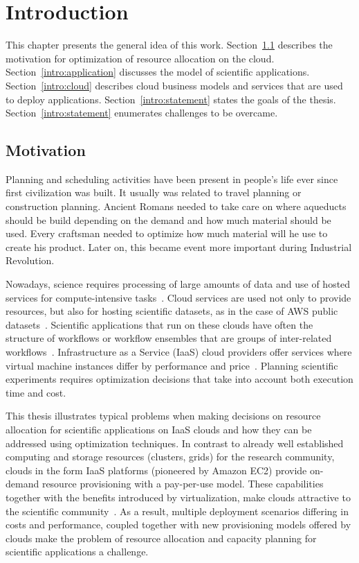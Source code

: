 \chapter{Introduction}
\label{chap:introduction} 

This chapter presents the general idea of this work. Section~\ref{intro:motivation} describes the motivation for optimization of resource allocation on the cloud. Section~\ref{intro:application} discusses the model of scientific applications. Section~\ref{intro:cloud} describes cloud business models and services that are used to deploy applications. Section~\ref{intro:statement} states the goals of the thesis. Section~\ref{intro:statement} enumerates challenges to be overcame. 

\section{Motivation}
\label{intro:motivation}

Planning and scheduling activities have been present in people's life ever since first civilization was built. It usually was related to travel planning or construction planning. Ancient Romans needed to take care on where aqueducts should be build depending on the demand and how much material should be used. Every craftsman needed to optimize how much material will he use to create his product. Later on, this became event more important during Industrial Revolution.

Nowadays, science requires processing of large amounts of data and use of hosted services for compute-intensive tasks~\cite{Deelman-PPL13}. Cloud services are used not only to provide resources, but also for hosting scientific datasets, as in the case of AWS public datasets~\cite{AWS-public-dataset}. Scientific applications that run on these clouds have often the structure of workflows or workflow ensembles that are groups of inter-related workflows~\cite{Malawski-SC12}. Infrastructure as a Service (IaaS) cloud providers offer services where virtual machine instances differ by performance and price~\cite{Bubak-CCGrid13}. Planning scientific experiments requires optimization decisions that take into account both execution time and cost.

This thesis illustrates typical problems when making decisions on resource allocation for scientific applications on IaaS clouds and how they can be addressed using optimization techniques. In contrast to already well established computing and storage resources (clusters, grids) for the research community, clouds in the form IaaS  platforms (pioneered by Amazon EC2) provide on-demand resource provisioning with a pay-per-use model. These capabilities together with the benefits introduced by virtualization, make clouds attractive to the scientific community~\cite{Deelman09}. As a result, multiple deployment scenarios differing in costs and performance, coupled together with new provisioning models offered by clouds make the problem of resource allocation and capacity planning for scientific applications a challenge.

